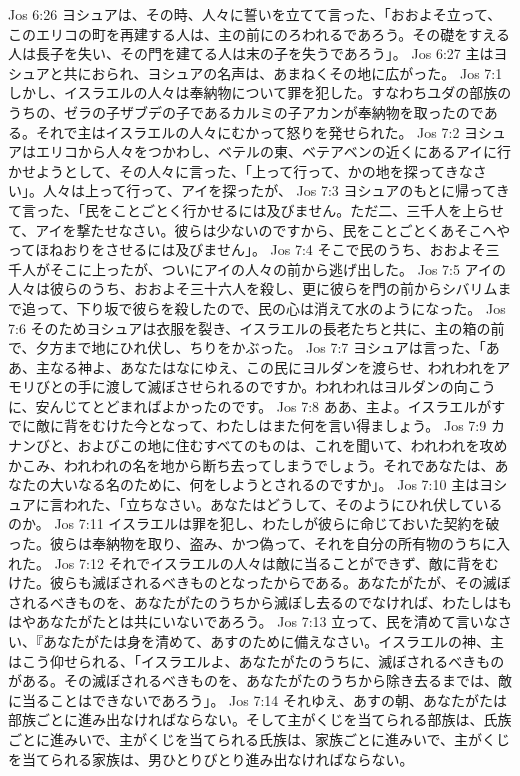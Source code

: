 Jos 6:26  ヨシュアは、その時、人々に誓いを立てて言った、「おおよそ立って、このエリコの町を再建する人は、主の前にのろわれるであろう。その礎をすえる人は長子を失い、その門を建てる人は末の子を失うであろう」。
Jos 6:27  主はヨシュアと共におられ、ヨシュアの名声は、あまねくその地に広がった。
Jos 7:1  しかし、イスラエルの人々は奉納物について罪を犯した。すなわちユダの部族のうちの、ゼラの子ザブデの子であるカルミの子アカンが奉納物を取ったのである。それで主はイスラエルの人々にむかって怒りを発せられた。
Jos 7:2  ヨシュアはエリコから人々をつかわし、ベテルの東、ベテアベンの近くにあるアイに行かせようとして、その人々に言った、「上って行って、かの地を探ってきなさい」。人々は上って行って、アイを探ったが、
Jos 7:3  ヨシュアのもとに帰ってきて言った、「民をことごとく行かせるには及びません。ただ二、三千人を上らせて、アイを撃たせなさい。彼らは少ないのですから、民をことごとくあそこへやってほねおりをさせるには及びません」。
Jos 7:4  そこで民のうち、おおよそ三千人がそこに上ったが、ついにアイの人々の前から逃げ出した。
Jos 7:5  アイの人々は彼らのうち、おおよそ三十六人を殺し、更に彼らを門の前からシバリムまで追って、下り坂で彼らを殺したので、民の心は消えて水のようになった。
Jos 7:6  そのためヨシュアは衣服を裂き、イスラエルの長老たちと共に、主の箱の前で、夕方まで地にひれ伏し、ちりをかぶった。
Jos 7:7  ヨシュアは言った、「ああ、主なる神よ、あなたはなにゆえ、この民にヨルダンを渡らせ、われわれをアモリびとの手に渡して滅ぼさせられるのですか。われわれはヨルダンの向こうに、安んじてとどまればよかったのです。
Jos 7:8  ああ、主よ。イスラエルがすでに敵に背をむけた今となって、わたしはまた何を言い得ましょう。
Jos 7:9  カナンびと、およびこの地に住むすべてのものは、これを聞いて、われわれを攻めかこみ、われわれの名を地から断ち去ってしまうでしょう。それであなたは、あなたの大いなる名のために、何をしようとされるのですか」。
Jos 7:10  主はヨシュアに言われた、「立ちなさい。あなたはどうして、そのようにひれ伏しているのか。
Jos 7:11  イスラエルは罪を犯し、わたしが彼らに命じておいた契約を破った。彼らは奉納物を取り、盗み、かつ偽って、それを自分の所有物のうちに入れた。
Jos 7:12  それでイスラエルの人々は敵に当ることができず、敵に背をむけた。彼らも滅ぼされるべきものとなったからである。あなたがたが、その滅ぼされるべきものを、あなたがたのうちから滅ぼし去るのでなければ、わたしはもはやあなたがたとは共にいないであろう。
Jos 7:13  立って、民を清めて言いなさい、『あなたがたは身を清めて、あすのために備えなさい。イスラエルの神、主はこう仰せられる、「イスラエルよ、あなたがたのうちに、滅ぼされるべきものがある。その滅ぼされるべきものを、あなたがたのうちから除き去るまでは、敵に当ることはできないであろう」。
Jos 7:14  それゆえ、あすの朝、あなたがたは部族ごとに進み出なければならない。そして主がくじを当てられる部族は、氏族ごとに進みいで、主がくじを当てられる氏族は、家族ごとに進みいで、主がくじを当てられる家族は、男ひとりびとり進み出なければならない。
